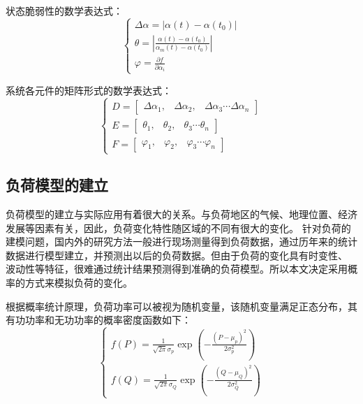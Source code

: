 状态脆弱性的数学表达式：
  \begin{equation}
  \left\{\begin{array}{l}{\Delta \alpha=\left|\alpha(t)-\alpha\left(t_{0}\right)\right|} \\
   {\theta=\left|\frac{\alpha(t)-\alpha\left(t_{0}\right)}{\alpha_{m}(t)-\alpha\left(t_{0}\right)}\right|} \\
   {\varphi=\frac{\partial f}{\partial \alpha_{i}}}\end{array}\right.
  \end{equation}
  
系统各元件的矩阵形式的数学表达式：
\begin{equation}
  \left\{\begin{array}{l}{D=\left[\begin{array}{lll}{\Delta \alpha_{1},} & {\Delta \alpha_{2},} & {\Delta \alpha_{3} \cdots \Delta \alpha_{n}}\end{array}\right]} \\
   {E=\left[\begin{array}{lll}{\theta_{1},} & {\theta_{2},} & {\theta_{3} \cdots \theta_{n}}\end{array}\right]} \\
   {F=\left[\begin{array}{lll}{\varphi_{1},} & {\varphi_{2},} & {\varphi_{3} \cdots \varphi_{n}}\end{array}\right]}\end{array}\right.
  \end{equation}

\subsection{负荷模型的建立}
\label{sec:vulneStaus}
负荷模型的建立与实际应用有着很大的关系。与负荷地区的气候、地理位置、经济发展等因素有关，因此，负荷变化特性随区域的不同有很大的变化。
针对负荷的建模问题，国内外的研究方法一般进行现场测量得到负荷数据，通过历年来的统计数据进行模型建立，并预测出以后的负荷数据\cite{refs71,refs72}。但由于负荷的变化具有时变性、
波动性等特征，很难通过统计结果预测得到准确的负荷模型。所以本文决定采用概率的方式来模拟负荷的变化。

根据概率统计原理，负荷功率可以被视为随机变量，该随机变量满足正态分布，其有功功率和无功功率的概率密度函数如下：
\begin{equation}
\label{equ:chap3:probability}
\left\{\begin{array}{l}{f(P)=\frac{1}{\sqrt{2 \pi} \sigma_{p}} \exp \left(-\frac{\left(P-\mu_{p}\right)^{2}}{2 \sigma_{p}^{2}}\right)} \\ 
{f(Q)=\frac{1}{\sqrt{2 \pi} \sigma_{Q}} \exp \left(-\frac{\left(Q-\mu_{Q}\right)^{2}}{2 \sigma_{Q}^{2}}\right)}\end{array}\right.
\end{equation}

